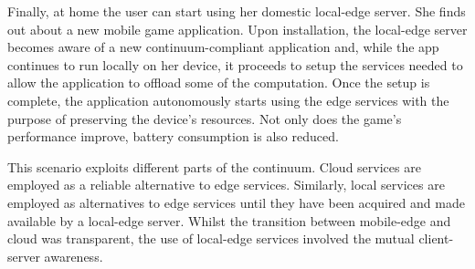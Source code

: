 Finally, at home the user can start using her domestic local-edge server. She finds out about a new mobile game application. Upon installation, the local-edge server becomes aware of a new continuum-compliant application and, while the app continues to run locally on her device, it proceeds to setup the services needed to allow the application to offload some of the computation. Once the setup is complete, the application autonomously starts using the edge services with the purpose of preserving the device's resources. Not only does the game's performance improve, battery consumption is also reduced.  

This scenario exploits different parts of the continuum. Cloud services are employed as a reliable alternative to edge services. Similarly, local services are employed as alternatives to edge services until they have been acquired and made available by a local-edge server. Whilst the transition between mobile-edge and cloud was transparent, the use of local-edge services involved the mutual client-server awareness.